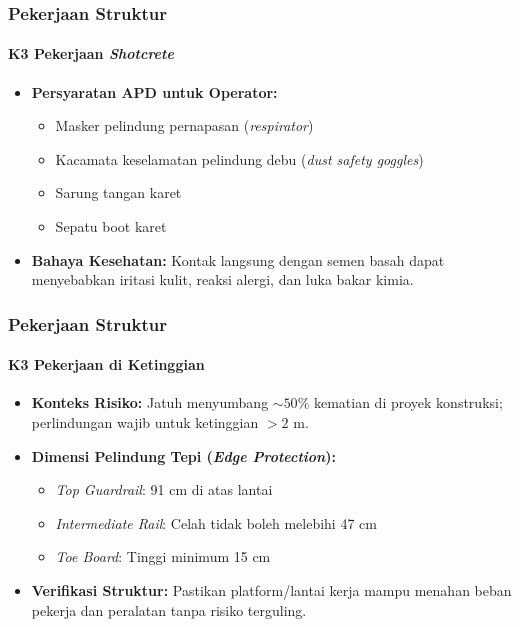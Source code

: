 \documentclass[../main.tex]{subfiles}
\begin{document}
\begin{frame}[mytitle=standard,c,mycolor=digiPH_ocean,dark]
	\frametitle{Pekerjaan Struktur}
	\framesubtitle{K3 Pekerjaan \textit{Shotcrete}}
	\begin{itemize}
		\item \textbf{Persyaratan APD untuk Operator:}
		      \begin{itemize}
			      \item Masker pelindung pernapasan (\textit{respirator})
			      \item Kacamata keselamatan pelindung debu (\textit{dust safety goggles})
			      \item Sarung tangan karet
			      \item Sepatu boot karet
		      \end{itemize}
		\item \textbf{Bahaya Kesehatan:} Kontak langsung dengan semen basah dapat menyebabkan iritasi kulit, reaksi alergi, dan luka bakar kimia.
	\end{itemize}
\end{frame}

\begin{frame}[mytitle=standard,t,mycolor=digiPH_gray,light]
	\frametitle{Pekerjaan Struktur}
	\framesubtitle{K3 Pekerjaan di Ketinggian}
	\begin{itemize}
		\item \textbf{Konteks Risiko:} Jatuh menyumbang $\sim 50\%$ kematian di proyek konstruksi; perlindungan wajib untuk ketinggian $> 2\text{ m}$.
		\item \textbf{Dimensi Pelindung Tepi (\textit{Edge Protection}):}
		      \begin{itemize}
			      \item \textit{Top Guardrail}: 91 cm di atas lantai
			      \item \textit{Intermediate Rail}: Celah tidak boleh melebihi 47 cm
			      \item \textit{Toe Board}: Tinggi minimum 15 cm
		      \end{itemize}
		\item \textbf{Verifikasi Struktur:} Pastikan platform/lantai kerja mampu menahan beban pekerja dan peralatan tanpa risiko terguling.
	\end{itemize}
\end{frame}
\end{document}
